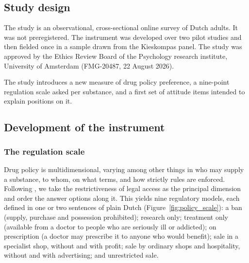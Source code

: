 
\subsection{Study design}

The study is an observational, cross-sectional online survey of Dutch adults. It was not
preregistered. The instrument was developed over two pilot studies and then fielded once in a sample
drawn from the Kieskompas panel. The study was approved by the Ethics Review Board of the Psychology
research institute, University of Amsterdam (FMG-20487, 22 August 2026).

The study introduces a new measure of drug policy preference, a nine-point regulation scale asked per
substance, and a first set of attitude items intended to explain positions on it.

\subsection{Development of the instrument}

\subsubsection{The regulation scale}

Drug policy is multidimensional, varying among other things in who may supply a substance, to whom,
on what terms, and how strictly rules are enforced. Following \citet{maccoun2001}, we take the
restrictiveness of legal access as the principal dimension and order the answer options along it.
This yields nine regulatory models, each defined in one or two sentences of plain Dutch
(Figure~\ref{fig:policy_scale}): a ban (supply, purchase and possession prohibited); research only;
treatment only (available from a doctor to people who are seriously ill or addicted); on prescription
(a doctor may prescribe it to anyone who would benefit); sale in a specialist shop, without and with
profit; sale by ordinary shops and hospitality, without and with advertising; and unrestricted sale.

